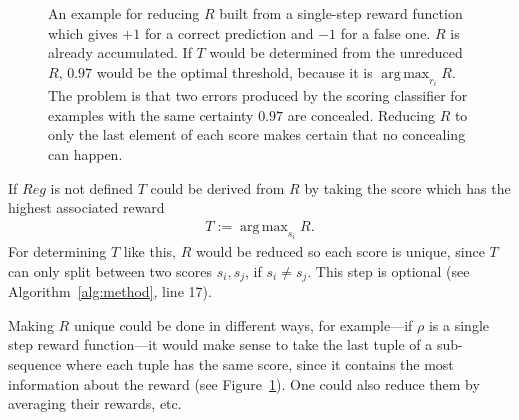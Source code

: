 \documentclass[twoside,11pt]{article}
\DeclareMathOperator*{\argmax}{arg\,max}
\begin{document}
\begin{figure}
  \begin{center}
  \end{center}
  \caption{An example for reducing $R$ built from a
           single-step reward function which gives $+1$ for
           a correct prediction and $-1$ for a false one.
           $R$ is already accumulated.
           If $T$ would be determined from the unreduced
           $R$, $0.97$ would be the optimal threshold,
           because it is $\argmax_{r_i} R$. The problem is
           that two errors produced by the scoring
           classifier for examples with the same
           certainty $0.97$ are concealed. Reducing $R$
           to only the last element of each score makes
           certain that no concealing can happen.}
  \label{fig:reduce}
\end{figure}

If $Reg$ is not defined $T$ could be derived from $R$
by taking the score which has the highest associated
reward
\begin{align}
  \label{eq:T_R}
  T := \argmax_{s_i} R.
\end{align}
For determining $T$ like this, $R$ would be reduced so each
score is unique, since $T$ can only split between two
scores $s_i, s_j$, if $s_i \neq s_j$.
This step is optional
(see Algorithm~\ref{alg:method}, line 17).

Making $R$ unique could be done in different ways, for
example---if $\rho$ is a single step reward function---it
would make sense to take the last tuple of a sub-sequence
where each tuple has the same score, since it contains the
most information about the reward
(see Figure~\ref{fig:reduce}).
One could also reduce them by averaging their rewards, etc.
\end{document}
